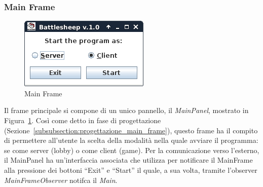 \subsubsection{Main Frame}
\begin{figure}[!h]
	\centering
	\includegraphics[scale=0.5]{core/imgs/gui/main_frame}
	\caption{Main Frame}
	\label{figure:main_frame}
\end{figure}
Il frame principale si compone di un unico pannello, il \textit{MainPanel},
mostrato in Figura~\ref{figure:main_frame}. Così come detto in fase di
progettazione (Sezione~\ref{subsubsection:progettazione_main_frame}), questo
frame ha il compito di permettere all'utente la scelta della modalità nella
quale avviare il programma: se come server (lobby) o come client (game).\newline
Per la comunicazione verso l'esterno, il MainPanel ha un'interfaccia associata
che utilizza per notificare il MainFrame alla pressione dei bottoni ``Exit'' e
``Start'' il quale, a sua volta, tramite l'observer \textit{MainFrameObserver}
notifca il \textit{Main}.



